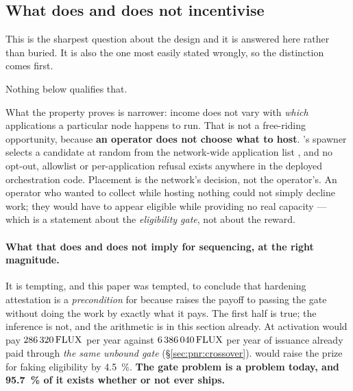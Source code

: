 \subsection{What \PNR{} does and does not incentivise}
\label{sec:pnr:hosting}

This is the sharpest question about the design and it is answered here rather than buried. It is
also the one most easily stated wrongly, so the distinction comes first.

 Nothing below qualifies that.

What the property proves is narrower: income does not vary with \emph{which} applications a
particular node happens to run. That is not a free-riding opportunity, because \textbf{an operator
does not choose what to host}. \FluxOS{}'s spawner selects a candidate at random from the
network-wide application list \shipped
{},
and no opt-out, allowlist or per-application refusal exists anywhere in the deployed orchestration
code. Placement is the network's decision, not the operator's. An operator who wanted to collect
\PNR{} while hosting nothing could not simply decline work; they would have to appear eligible while
providing no real capacity --- which is a statement about the \emph{eligibility gate}, not about the
reward.

\paragraph{What that does and does not imply for sequencing, at the right magnitude.} It is
tempting, and this paper was tempted, to conclude that hardening attestation is a
\emph{precondition} for \PNR{} because \PNR{} raises the payoff to passing the gate without doing the
work by exactly what it pays. The first half is true; the inference is not, and the arithmetic is in
this section already. At activation \PNR{} would pay $\num{286320}\,\mathrm{FLUX}$ per year against
$\num{6386040}\,\mathrm{FLUX}$ per year of issuance already paid through \emph{the same unbound gate}
(\S\ref{sec:pnr:crossover}). \PNR{} would raise the prize for faking eligibility by
\SI{4.5}{\percent}. \textbf{The gate problem is a \PoN{} problem today, and \SI{95.7}{\percent} of it
exists whether or not \PNR{} ever ships.}

